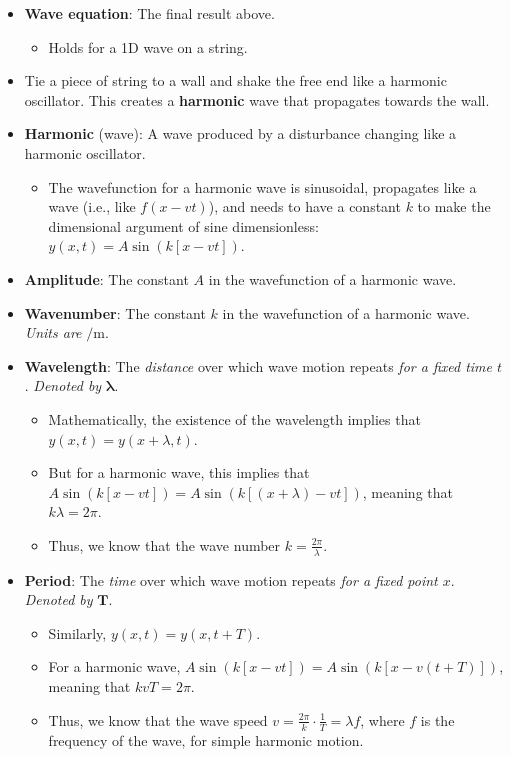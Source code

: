 \documentclass[../notes.tex]{subfiles}
\begin{document}
\begin{itemize}
    \item \textbf{Wave equation}: The final result above.
    \begin{itemize}
        \item Holds for a 1D wave on a string.
    \end{itemize}
    \item Tie a piece of string to a wall and shake the free end like a harmonic oscillator. This creates a \textbf{harmonic} wave that propagates towards the wall.
    \item \textbf{Harmonic} (wave): A wave produced by a disturbance changing like a harmonic oscillator.
    \begin{itemize}
        \item The wavefunction for a harmonic wave is sinusoidal, propagates like a wave (i.e., like $f(x-vt)$), and needs to have a constant $k$ to make the dimensional argument of sine dimensionless: $y(x,t)=A\sin(k[x-vt])$.
    \end{itemize}
    \item \textbf{Amplitude}: The constant $A$ in the wavefunction of a harmonic wave.
    \item \textbf{Wavenumber}: The constant $k$ in the wavefunction of a harmonic wave. \emph{Units are} $\si{\per\meter}$.
    \item \textbf{Wavelength}: The \emph{distance} over which wave motion repeats \emph{for a fixed time $t$}. \emph{Denoted by} $\bm{\lambda}$.
    \begin{itemize}
        \item Mathematically, the existence of the wavelength implies that $y(x,t)=y(x+\lambda,t)$.
        \item But for a harmonic wave, this implies that $A\sin(k[x-vt])=A\sin(k[(x+\lambda)-vt])$, meaning that $k\lambda=2\pi$.
        \item Thus, we know that the wave number $k=\frac{2\pi}{\lambda}$.
    \end{itemize}
    \item \textbf{Period}: The \emph{time} over which wave motion repeats \emph{for a fixed point $x$}. \emph{Denoted by} $\bm{T}$.
    \begin{itemize}
        \item Similarly, $y(x,t)=y(x,t+T)$.
        \item For a harmonic wave, $A\sin(k[x-vt])=A\sin(k[x-v(t+T)])$, meaning that $kvT=2\pi$.
        \item Thus, we know that the wave speed $v=\frac{2\pi}{k}\cdot\frac{1}{T}=\lambda f$, where $f$ is the frequency of the wave, for simple harmonic motion.

\end{itemize}
\end{itemize}
\end{document}
